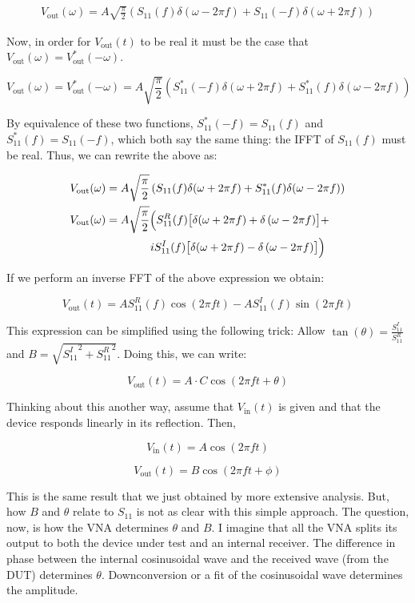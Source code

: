 \documentclass{article}
\begin{document}
\begin{align*}
   V_{\text{out}}(\omega) = A \sqrt{\frac{\pi}{2}} \left( S_{11}(f)
   \delta(\omega - 2\pi f) + S_{11}(-f) \delta(\omega + 2\pi f) \right)
\end{align*}

Now, in order for $V_{\text{out}}(t)$ to be real it must be the case that
$ V_{\text{out}}(\omega) = V_{\text{out}}^*(-\omega)$.

\[
   V_{\text{out}}(\omega) = V_{\text{out}}^*(-\omega) = A \sqrt{\frac{\pi}{2}} \left( S_{11}^*(-f)
   \delta(\omega+2\pi f) + S_{11}^*(f) \delta(\omega - 2\pi f) \right)
\]

By equivalence of these two functions, $ S_{11}^*(-f) = S_{11}(f) $ and $
S_{11}^*(f) = S_{11}(-f) $, which both say the same thing: the IFFT of $
S_{11}(f) $ must be real. Thus, we can rewrite the above as:

\begin{align*}
   V_{\text{out}}(\omega) &= A \sqrt{\frac{\pi}{2}} \left( S_{11}(f)
   \delta(\omega+2\pi f) + S_{11}^*(f) \delta(\omega - 2\pi f) \right) \\
   V_{\text{out}}(\omega) &= A \sqrt{\frac{\pi}{2}} \Bigl( S_{11}^R(f)
   \bigl[ \delta (\omega+2\pi f) + \delta\left(\omega - 2\pi f\right) \bigr] + \\
   & \qquad\qquad i S_{11}^I(f) \bigl[ \delta(\omega + 2\pi f) - \delta\left(\omega - 2\pi f\right) \bigr] \Bigr)
\end{align*}

If we perform an inverse FFT of the above expression we obtain:

\[
   V_{\text{out}}(t) = A S_{11}^R(f) \cos(2\pi f t) - A S_{11}^I(f) \sin(2\pi f t)
\]

This expression can be simplified using the following trick: Allow $
\tan(\theta) = \frac{S_{11}^I}{S_{11}^R} $ and $ B = \sqrt{{S_{11}^I}^2 +
{ S_{11}^R }^2} $. Doing this, we can write:

\[
   V_{\text{out}}(t) = A\cdot C \cos(2\pi f t + \theta)
\]

Thinking about this another way, assume that $ V_{\text{in}}(t) $ is given and
that the device responds linearly in its reflection. Then,

\[
   V_{\text{in}}(t) = A \cos(2\pi f t)
\]

\[
   V_{\text{out}}(t) = B \cos(2\pi f t + \phi)
\]

This is the same result that we just obtained by more extensive analysis. But,
how $ B $ and $ \theta $ relate to $ S_{11} $ is not as clear with this simple
approach. The question, now, is how the VNA determines $ \theta $ and $ B $. I
imagine that all the VNA splits its output to both the device under test and an
internal receiver. The difference in phase between the internal cosinusoidal
wave and the received wave (from the DUT) determines $ \theta $. Downconversion
or a fit of the cosinusoidal wave determines the amplitude.
\end{document}
